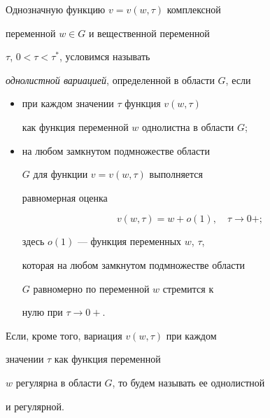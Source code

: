 \begin{defnnonum}


Однозначную функцию $v=v(w,\tau)$ комплексной


переменной $w\in G$ и вещественной переменной


$\tau$, $0<\tau<\tau^{*}$, условимся называть


{\it однолистной вариацией}, определенной в области $G$, если


\begin{itemize}


\item[---] при каждом значении $\tau$ функция $v(w,\tau)$  


как функция переменной $w$ однолистна в области $G$; 


\item[---] на любом замкнутом подмножестве области


$G$ для функции $v=v(w,\tau)$ выполняется


равномерная оценка 


$$


v(w,\tau)=w+o(1),\quad \tau\to 0+;


$$


здесь $o(1)$ --- функция переменных $w$, $\tau$,


которая на любом замкнутом подмножестве области


$G$ равномерно по переменной $w$ стремится к 


нулю при $\tau\to 0+$.


\end{itemize}


Если, кроме того, вариация $v(w,\tau)$ при каждом


значении $\tau$ как функция переменной


$w$ регулярна в области $G$, то будем называть ее однолистной 


и регулярной.


\end{defnnonum}








